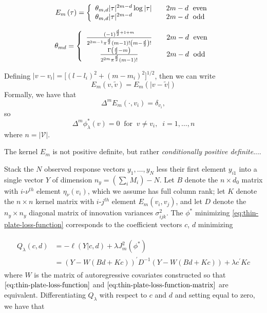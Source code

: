 \documentclass[12pt]{article}
\theoremstyle{definition}
\begin{document}
\begin{align} \label{eq:thin-plate-pseudo-kernel-1}
E_m\left( \tau \right) = \left \{ \begin{array}{ll}   \theta_{m,d} \vert \tau \vert^{2m-d}\log \vert \tau \vert  &  \quad 2m-d \mbox{\; even} \\
					   \theta_{m,d} \vert \tau \vert^{2m-d}& \quad 2m-d \mbox{\; odd} \end{array} \right.
\end{align}

\begin{align} \label{eq:thin-plate-pseudo-kernel-2}
\theta_{md} = \left \{ \begin{array}{cl}   \frac{ \left( -1 \right)^{\frac{d}{2} + 1 + m} }{ 2^{2m-1}\pi^{\frac{d}{2}}\left(m-1\right)! \left( m - \frac{d}{2} \right)! }   & \quad 2m-d \mbox{\; even} \\
					   \frac{ \Gamma\left( \frac{d}{2} - m\right) }{ 2^{2m}\pi^{\frac{d}{2}}\left(m-1\right)! }    & \quad 2m-d \mbox{\; odd} \end{array} \right.
\end{align}

Defining $\vert v - v_i \vert = \bigg[ \left( l - l_i \right)^2 + \left( m - m_i \right)^2  \bigg]^{1/2}$, then we can write 
\[
E_m\left( v,\tilde{v} \right) = E_m\left(\vert v-\tilde{v} \vert \right) 
\]
\noindent
Formally, we have that 
\[
\Delta^m E_m\left( \cdot,v_i \right) = \delta_{v_i}, 
\]
so 
\[
\Delta^m \phi^*_\lambda \left( v \right) = 0 \;\; \mbox{for}\;\;v \ne v_i, \;\;i=1,\dots, n 
\]
\noindent
where $n = \vert \mathcal{V} \vert$.

\bigskip
The kernel $E_m$ is not positive definite, but rather \emph{conditionally positive definite}....


Stack the $N$ observed response vectors $y_1,\dots, y_N$ less their first element $y_{i1}$ into a single vector $Y$ of dimension $n_y=\left(\sum \limits_{i} M_i \right) - N$.  Let $B$ denote the $n \times d_0$ matrix with $i$-$\nu^{th}$ element $\eta_\nu\left(v_i\right)$, which we assume has full column rank; let $K$ denote the $n \times n$ kernel matrix with $i$-$j^{th}$ element $E_m\left(v_i, v_j\right)$, and let $D$ denote the $n_y \times n_y$ diagonal matrix of innovation variances $\sigma^2_{ijk}$. The $\phi^*$ minimizing \ref{eq:thin-plate-loss-function} corresponds to the coefficient vectors $c$, $d$ minimizing

\begin{align}
\begin{split} \label{eq:thin-plate-loss-function-matrix} 
Q_\lambda\left(c,d\right) &= -\ell\left(Y \vert c,d\right) + \lambda J_m^2\left(\phi^*\right) \\
&= \left( Y - W \left( Bd + Kc \right) \right)^\prime D^{-1} \left( Y - W \left( Bd + Kc \right) \right) + \lambda c^\prime K c 
\end{split}
\end{align} 
\bigskip
\noindent
 where $W$ is the matrix of autoregressive covariates constructed so that $\ref{eq:thin-plate-loss-function}$ and $\ref{eq:thin-plate-loss-function-matrix}$ are equivalent. 
\bigskip
Differentiating $Q_\lambda$ with respect to $c$ and $d$ and setting equal to zero, we have that 
\end{document}

